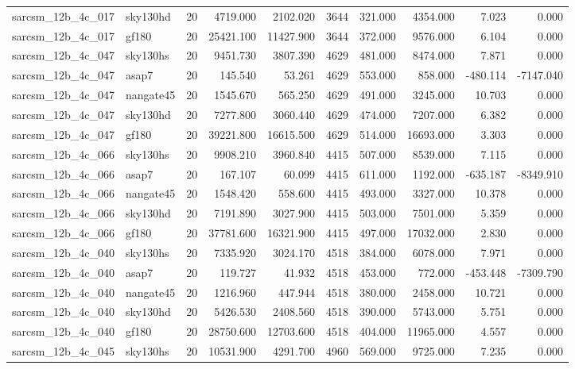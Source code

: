 \begin{longtable}{llrrrrrrrr}
sarcsm\_12b\_4c\_017 & sky130hd & 20 & 4719.000 & 2102.020 & 3644 & 321.000 & 4354.000 & 7.023 & 0.000 \\
sarcsm\_12b\_4c\_017 & gf180 & 20 & 25421.100 & 11427.900 & 3644 & 372.000 & 9576.000 & 6.104 & 0.000 \\
sarcsm\_12b\_4c\_047 & sky130hs & 20 & 9451.730 & 3807.390 & 4629 & 481.000 & 8474.000 & 7.871 & 0.000 \\
sarcsm\_12b\_4c\_047 & asap7 & 20 & 145.540 & 53.261 & 4629 & 553.000 & 858.000 & -480.114 & -7147.040 \\
sarcsm\_12b\_4c\_047 & nangate45 & 20 & 1545.670 & 565.250 & 4629 & 491.000 & 3245.000 & 10.703 & 0.000 \\
sarcsm\_12b\_4c\_047 & sky130hd & 20 & 7277.800 & 3060.440 & 4629 & 474.000 & 7207.000 & 6.382 & 0.000 \\
sarcsm\_12b\_4c\_047 & gf180 & 20 & 39221.800 & 16615.500 & 4629 & 514.000 & 16693.000 & 3.303 & 0.000 \\
sarcsm\_12b\_4c\_066 & sky130hs & 20 & 9908.210 & 3960.840 & 4415 & 507.000 & 8539.000 & 7.115 & 0.000 \\
sarcsm\_12b\_4c\_066 & asap7 & 20 & 167.107 & 60.099 & 4415 & 611.000 & 1192.000 & -635.187 & -8349.910 \\
sarcsm\_12b\_4c\_066 & nangate45 & 20 & 1548.420 & 558.600 & 4415 & 493.000 & 3327.000 & 10.378 & 0.000 \\
sarcsm\_12b\_4c\_066 & sky130hd & 20 & 7191.890 & 3027.900 & 4415 & 503.000 & 7501.000 & 5.359 & 0.000 \\
sarcsm\_12b\_4c\_066 & gf180 & 20 & 37781.600 & 16321.900 & 4415 & 497.000 & 17032.000 & 2.830 & 0.000 \\
sarcsm\_12b\_4c\_040 & sky130hs & 20 & 7335.920 & 3024.170 & 4518 & 384.000 & 6078.000 & 7.971 & 0.000 \\
sarcsm\_12b\_4c\_040 & asap7 & 20 & 119.727 & 41.932 & 4518 & 453.000 & 772.000 & -453.448 & -7309.790 \\
sarcsm\_12b\_4c\_040 & nangate45 & 20 & 1216.960 & 447.944 & 4518 & 380.000 & 2458.000 & 10.721 & 0.000 \\
sarcsm\_12b\_4c\_040 & sky130hd & 20 & 5426.530 & 2408.560 & 4518 & 390.000 & 5743.000 & 5.751 & 0.000 \\
sarcsm\_12b\_4c\_040 & gf180 & 20 & 28750.600 & 12703.600 & 4518 & 404.000 & 11965.000 & 4.557 & 0.000 \\
sarcsm\_12b\_4c\_045 & sky130hs & 20 & 10531.900 & 4291.700 & 4960 & 569.000 & 9725.000 & 7.235 & 0.000 \\

\end{longtable}
